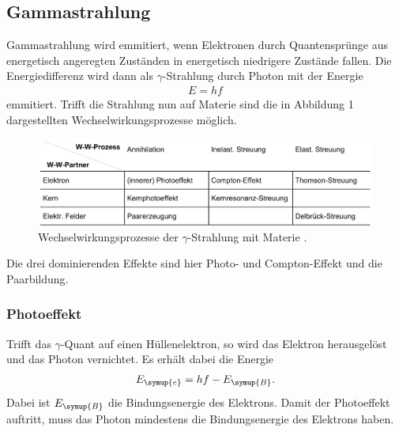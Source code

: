 \subsection{Gammastrahlung}
\label{sec:Gammastrahlung}
Gammastrahlung wird emmitiert, wenn Elektronen durch Quantensprünge aus energetisch angeregten Zuständen
in energetisch niedrigere Zustände fallen. Die Energiedifferenz wird dann als $\gamma$-Strahlung durch Photon
mit der Energie
\begin{align*}
    E = hf
\end{align*}
emmitiert. Trifft die Strahlung nun auf Materie sind die in Abbildung 1 dargestellten
Wechselwirkungsprozesse möglich.
\begin{figure}
    \centering
    \label{fig:WWProzesse}
    \includegraphics[width=\textwidth]{Bilder/Wechselwirkung.png}
    \caption{Wechselwirkungsprozesse der $\gamma$-Strahlung mit Materie \cite{sample}.}
\end{figure}
Die drei dominierenden Effekte sind hier Photo- und Compton-Effekt und die Paarbildung.

\subsubsection{Photoeffekt}
\label{sec:Photoeffekt}
Trifft das $\gamma$-Quant auf einen Hüllenelektron, so wird das Elektron herausgelöst und das Photon vernichtet.
Es erhält dabei die Energie
\begin{align*}
    E_{\symup{e}} = hf - E_{\symup{B}}.
\end{align*}
Dabei ist $E_{\symup{B}}$ die Bindungsenergie des Elektrons. Damit der Photoeffekt auftritt, muss das Photon
mindestens die Bindungsenergie des Elektrons haben.

